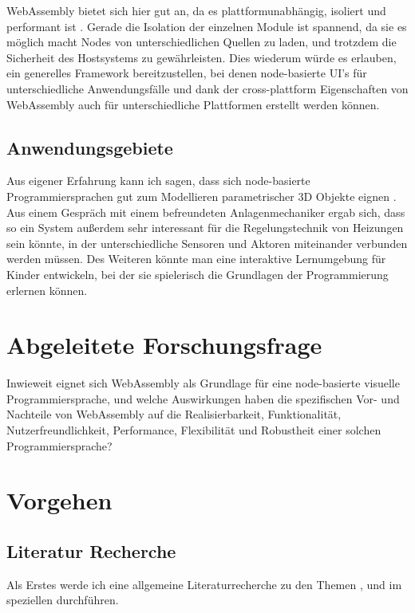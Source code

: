 \documentclass[ngerman]{article}
\begin{document}
\linebreak
\linebreak
WebAssembly bietet sich hier gut an, da es plattformunabhängig, isoliert und performant ist \cite{Haas2017}. Gerade die Isolation der einzelnen Module ist spannend, da sie es möglich macht Nodes von unterschiedlichen Quellen zu laden, und trotzdem die Sicherheit des Hostsystems zu gewährleisten.
\linebreak
\linebreak
Dies wiederum würde es erlauben, ein generelles Framework bereitzustellen, bei denen node-basierte UI's für unterschiedliche Anwendungsfälle und dank der cross-plattform Eigenschaften von WebAssembly auch für unterschiedliche Plattformen erstellt werden können.
\linebreak
\linebreak
\subsection{Anwendungsgebiete}
Aus eigener Erfahrung kann ich sagen, dass sich node-basierte Programmiersprachen gut zum Modellieren parametrischer 3D Objekte eignen \cite{Plantarium}. Aus einem Gespräch mit einem befreundeten Anlagenmechaniker ergab sich, dass so ein System außerdem sehr interessant für die Regelungstechnik von Heizungen sein könnte, in der unterschiedliche Sensoren und Aktoren miteinander verbunden werden müssen. Des Weiteren könnte man eine interaktive Lernumgebung für Kinder entwickeln, bei der sie spielerisch die Grundlagen der Programmierung erlernen können.

\section{Abgeleitete Forschungsfrage}
Inwieweit eignet sich WebAssembly als Grundlage für eine node-basierte visuelle Programmiersprache, und welche Auswirkungen haben die spezifischen Vor- und Nachteile von WebAssembly auf die Realisierbarkeit, Funktionalität, Nutzerfreundlichkeit, Performance, Flexibilität und Robustheit einer solchen Programmiersprache?

\section{Vorgehen}
\subsection{Literatur Recherche}
Als Erstes werde ich eine allgemeine Literaturrecherche zu den Themen ,  und im speziellen  durchführen.
\end{document}
